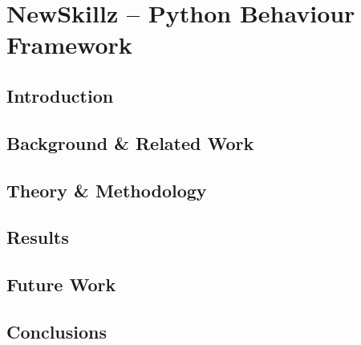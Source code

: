 \chapter{NewSkillz -- Python Behaviour Framework}
\label{chap:rl}

\section{Introduction}
\section{Background \& Related Work}
\section{Theory \& Methodology}
\section{Results}
\section{Future Work}
\section{Conclusions}
